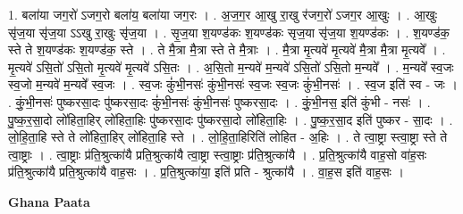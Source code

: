 \documentclass[17pt]{extarticle}
\begin{document}
1. बला॑या जग॒रो॑ ऽजग॒रो बला॑य॒ बला॑या जग॒रः । . अ॒ज॒ग॒र आ॒खु रा॒खु र॑जग॒रो॑ ऽजग॒र आ॒खुः । . आ॒खुः सृ॑ज॒या सृ॑ज॒या ऽऽखु रा॒खुः सृ॑ज॒या । . सृ॒ज॒या श॒यण्ड॑कः श॒यण्ड॑कः सृज॒या सृ॑ज॒या श॒यण्ड॑कः । . श॒यण्ड॑क॒ स्ते ते श॒यण्ड॑कः श॒यण्ड॑क॒ स्ते । . ते मै॒त्रा मै॒त्रा स्ते ते मै॒त्राः । . मै॒त्रा मृ॒त्यवे॑ मृ॒त्यवे॑ मै॒त्रा मै॒त्रा मृ॒त्यवे᳚ । . मृ॒त्यवे॑ ऽसि॒तो॑ ऽसि॒तो मृ॒त्यवे॑ मृ॒त्यवे॑ ऽसि॒तः । . अ॒सि॒तो म॒न्यवे॑ म॒न्यवे॑ ऽसि॒तो॑ ऽसि॒तो म॒न्यवे᳚ । . म॒न्यवे᳚ स्व॒जः स्व॒जो म॒न्यवे॑ म॒न्यवे᳚ स्व॒जः । . स्व॒जः कुं॑भी॒नसः॑ कुंभी॒नसः॑ स्व॒जः स्व॒जः कुं॑भी॒नसः॑ । . स्व॒ज इति॑ स्व - जः । . कुं॒भी॒नसः॑ पुष्करसा॒दः पु॑ष्करसा॒दः कुं॑भी॒नसः॑ कुंभी॒नसः॑ पुष्करसा॒दः । . कुं॒भी॒नस॒ इति॑ कुंभी - नसः॑ । . पु॒ष्क॒र॒सा॒दो लो॑हिता॒हिर् लो॑हिता॒हिः पु॑ष्करसा॒दः पु॑ष्करसा॒दो लो॑हिता॒हिः । . पु॒ष्क॒र॒सा॒द इति॑ पुष्कर - सा॒दः । . लो॒हि॒ता॒हि स्ते ते लो॑हिता॒हिर् लो॑हिता॒हि स्ते । . लो॒हि॒ता॒हिरिति॑ लोहित - अ॒हिः । . ते त्वा॒ष्ट्रा स्त्वा॒ष्ट्रा स्ते ते त्वा॒ष्ट्राः । . त्वा॒ष्ट्राः प्र॑ति॒श्रुत्का॑यै प्रति॒श्रुत्का॑यै त्वा॒ष्ट्रा स्त्वा॒ष्ट्राः प्र॑ति॒श्रुत्का॑यै । . प्र॒ति॒श्रुत्का॑यै वाह॒सो वा॑ह॒सः प्र॑ति॒श्रुत्का॑यै प्रति॒श्रुत्का॑यै वाह॒सः । . प्र॒ति॒श्रुत्का॑या॒ इति॑ प्रति - श्रुत्का॑यै । . वा॒ह॒स इति॑ वाह॒सः । \newline

\textbf{Ghana Paata } \newline
\end{document}
